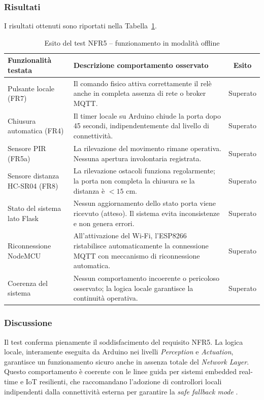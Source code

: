 \subsubsection*{Risultati}
I risultati ottenuti sono riportati nella Tabella~\ref{tab:nfr5_offline}.

\begin{table}[h!]
\centering
\caption{Esito del test NFR5 – funzionamento in modalità offline}
\label{tab:nfr5_offline}
\begin{tabular}{|p{6cm}|p{6.5cm}|c|}
\hline
\textbf{Funzionalità testata} & \textbf{Descrizione comportamento osservato} & \textbf{Esito} \\ \hline

Pulsante locale (FR7) &
Il comando fisico attiva correttamente il relè anche in completa assenza di rete o broker MQTT. &
Superato \\ \hline

Chiusura automatica (FR4) &
Il timer locale su Arduino chiude la porta dopo 45 secondi, indipendentemente dal livello di connettività. &
Superato \\ \hline

Sensore PIR (FR5a) &
La rilevazione del movimento rimane operativa. Nessuna apertura involontaria registrata. &
Superato \\ \hline

Sensore distanza HC-SR04 (FR8) &
La rilevazione ostacoli funziona regolarmente; la porta non completa la chiusura se la distanza è $<15$ cm. &
Superato \\ \hline

Stato del sistema lato Flask &
Nessun aggiornamento dello stato porta viene ricevuto (atteso). Il sistema evita inconsistenze e non genera errori. &
Superato \\ \hline

Riconnessione NodeMCU &
All'attivazione del Wi-Fi, l’ESP8266 ristabilisce automaticamente la connessione MQTT con meccanismo di riconnessione automatica. &
Superato \\ \hline

Coerenza del sistema &
Nessun comportamento incoerente o pericoloso osservato; la logica locale garantisce la continuità operativa. &
Superato \\ \hline

\end{tabular}
\end{table}

\subsubsection*{Discussione}
Il test conferma pienamente il soddisfacimento del requisito NFR5. La logica locale, interamente eseguita da Arduino nei livelli \textit{Perception} e \textit{Actuation}, garantisce un funzionamento sicuro anche in assenza totale del \textit{Network Layer}. Questo comportamento è coerente con le linee guida per sistemi embedded real-time e IoT resilienti, che raccomandano l’adozione di controllori locali indipendenti dalla connettività esterna per garantire la \textit{safe fallback mode} \cite{Marwedel2021, Avizienis2004}.

